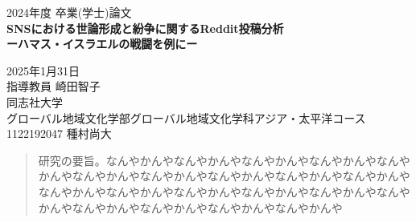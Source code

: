 \documentclass[11pt, a4j]{jreport}
\begin{document}
    \thispagestyle{empty}
    \begin{center}
        \vspace{20mm}
        {\Large\noindent 2024年度 卒業(学士)論文}\\
        \vspace{40mm}
        {\huge\noindent\textbf{SNSにおける世論形成と紛争に関するReddit投稿分析}}\\
        \medskip
        {\huge\noindent\textbf{ーハマス・イスラエルの戦闘を例にー}}\\
        \vspace{\baselineskip}
        \vspace{40mm}

        {\Large\noindent 2025年1月31日\\ \vspace{\baselineskip} 指導教員 崎田智子 \\ \vspace{\baselineskip} 同志社大学\\ グローバル地域文化学部グローバル地域文化学科アジア・太平洋コース \\ \vspace{\baselineskip} 1122192047 種村尚大\\ }
        \vspace{40mm}
    \end{center}

    \thispagestyle{empty}
    \clearpage

    \renewcommand{\abstractname}{要旨}

    \begin{abstract}
        研究の要旨。なんやかんやなんやかんやなんやかんやなんやかんやなんやかんやなんやかんやなんやかんやなんやかんやなんやかんやなんやかんやなんやかんやなんやかんやなんやかんやなんやかんやなんやかんやなんやかんやなんやかんやなんやかんやなんやかんやなんやかんや
    \end{abstract}


    \tableofcontents

    \pagestyle{fancy}
    \lhead{\rightmark}
    \renewcommand{\chaptermark}[1]{\markboth{第\ \normalfont\thechapter\ 章~~#1}{}}
\end{document}
